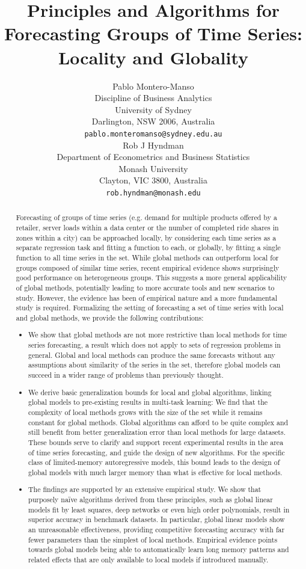 \documentclass[a4paper]{article}
\title{Principles and Algorithms for Forecasting Groups of Time Series:
Locality and Globality
}
\author{
  Pablo Montero-Manso%
    \\
  Discipline of Business Analytics\\
  University of Sydney\\
  Darlington, NSW 2006, Australia \\
  \texttt{pablo.monteromanso@sydney.edu.au} \\
   \And
 Rob J Hyndman\\
  Department of Econometrics and Business Statistics\\
  Monash University\\
  Clayton, VIC 3800, Australia \\
  \texttt{rob.hyndman@monash.edu} \\
}
\theoremstyle{custom}
\begin{document}
\maketitle

\begin{abstract}

Forecasting of groups of time series (e.g. demand for multiple products offered by a retailer, server loads within a data center or the number of completed ride shares in zones within a city) can be approached locally, by considering each time series as a separate regression task and fitting a function to each, or globally,
by fitting a single function to all time series in the set.
While global methods can outperform local for groups composed of similar time series, recent empirical
evidence shows surprisingly good performance on heterogeneous groups.
This suggests a more general applicability of global methods, potentially leading to more accurate tools and new scenarios to study. However, the evidence has been of empirical nature and a more fundamental study is required.
Formalizing the setting of forecasting a set of time series with local and global methods, we provide the following contributions:

\begin{itemize}
\item We show that global methods are not more restrictive than local methods for time series forecasting, a result which does not apply to sets of regression problems in general.
Global and local methods can produce the same forecasts without any assumptions about similarity of the series in the set, therefore global models can succeed in a wider range of problems than previously thought.
\item We derive basic generalization bounds for local and global algorithms, linking global models to pre-existing results in multi-task learning: We find that the complexity of local methods grows with the size of the set while it remains constant for global methods.
Global algorithms can afford to be quite complex and still benefit from better generalization error than local methods for large datasets.
These bounds serve to clarify and support recent experimental results in the area of time series forecasting, and guide the design of new algorithms.
For the specific class of limited-memory autoregressive models, this bound leads to the design of global models with much larger memory than what is effective for local methods.
\item The findings are supported by an extensive empirical study. We show that purposely naïve algorithms derived from these principles, such as global linear models fit by least squares, deep networks or even high order polynomials, result in superior accuracy in benchmark datasets.
In particular, global linear models show an unreasonable effectiveness, providing competitive forecasting accuracy with far fewer parameters than the simplest of local methods.
Empirical evidence points towards global models being able to automatically learn long memory patterns and related effects that are only available to local models if introduced manually.
\end{itemize}


\end{abstract}
\end{document}
